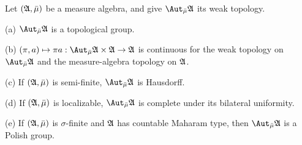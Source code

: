 Let $(\frak A,\bar\mu)$ be a measure algebra, and give $\AmuA$ 
its weak topology.

(a) $\AmuA$ is a topological group.

(b) $(\pi,a)\mapsto\pi a:\AmuA\times\frak A\to\frak A$ is continuous for
the weak topology on $\AmuA$ and the measure-algebra topology on
$\frak A$.

(c) If $(\frak A,\bar\mu)$ is semi-finite,
$\AmuA$ is Hausdorff.

(d) If $(\frak A,\bar\mu)$ is localizable,
$\AmuA$ is complete under its bilateral uniformity.

(e)
If $(\frak A,\bar\mu)$ is $\sigma$-finite
and $\frak A$ has countable
Maharam type, then $\AmuA$ is a Polish group.

